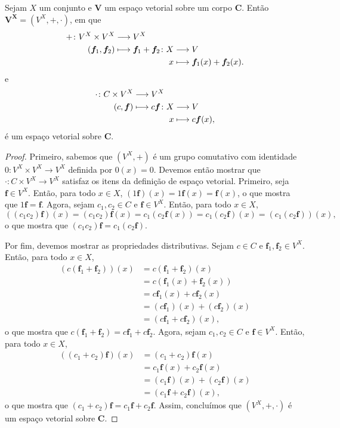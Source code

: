\begin{proposition}
Sejam $X$ um conjunto e $\bm V$ um espaço vetorial sobre um corpo $\bm C$. Então $\bm{V^X}=(V^X,+,\cdot)$, em que
	\begin{align*}
	\func{+}{V^X \times V^X}{V^X}{(\bm f_1,\bm f_2)}{
		\begin{aligned}[t]
		\func{\bm f_1+\bm f_2}{X}{V}{x}{\bm f_1(x)+\bm f_2(x).}
		\end{aligned}
	}
	\end{align*}
e
\begin{align*}
	\func{\cdot}{C \times V^X}{V^X}{(c,\bm f)}{
		\begin{aligned}[t]
		\func{c\bm f}{X}{V}{x}{c\bm f(x),}
		\end{aligned}
	}
	\end{align*}
é um espaço vetorial sobre $\bm C$.
\end{proposition}
\begin{proof}
Primeiro, sabemos que $(V^X,+)$ é um grupo comutativo com identidade $0\colon V^X \times V^X \to V^X$ definida por $0(x)=0$. Devemos então mostrar que $\cdot\colon C \times V^X \to V^X$ satisfaz os itens da definição de espaço vetorial. Primeiro, seja $\bm f \in V^X$. Então, para todo $x \in X$, $(1\bm f)(x)=1\bm f(x)=\bm f(x)$, o que mostra que $1\bm f=\bm f$. Agora, sejam $c_1,c_2 \in C$ e $\bm f \in V^X$. Então, para todo $x \in X$,
	\begin{equation*}
	((c_1c_2)\bm f)(x) = (c_1c_2)\bm f(x) = c_1(c_2\bm f(x)) = c_1(c_2\bm f)(x) = (c_1(c_2\bm f))(x),
	\end{equation*}
o que mostra que $(c_1c_2)\bm f=c_1(c_2\bm f)$.

Por fim, devemos mostrar as propriedades distributivas. Sejam $c \in C$ e $\bm f_1,\bm f_2 \in V^X$. Então, para todo $x \in X$,
	\begin{align*}
	(c(\bm f_1+\bm f_2))(x)&=c(\bm f_1+\bm f_2)(x) \\
	&=c(\bm f_1(x)+\bm f_2(x)) \\
	&= c\bm f_1(x)+c \bm f_2(x) \\
	&= (c\bm f_1)(x)+(c \bm f_2)(x) \\
	&=(c\bm f_1+c \bm f_2)(x),
	\end{align*}
o que mostra que $c(\bm f_1+\bm f_2)=c\bm f_1+c \bm f_2$. Agora, sejam $c_1,c_2 \in C$ e $\bm f \in V^X$. Então, para todo $x \in X$,
	\begin{align*}
	((c_1+c_2)\bm f)(x) &= (c_1+c_2) \bm f(x) \\
	&=c_1\bm f(x)+c_2\bm f(x) \\
	&=(c_1\bm f)(x)+(c_2\bm f)(x) \\
	&=(c_1\bm f+c_2\bm f)(x),
	\end{align*}
o que mostra que $(c_1+c_2)\bm f=c_1\bm f+c_2\bm f$. Assim, concluímos que $(V^X,+,\cdot)$ é um espaço vetorial sobre $\bm C$.
\end{proof}

